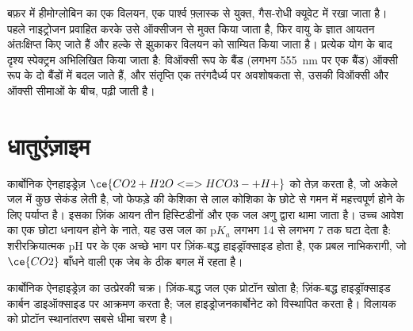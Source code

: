 \begin{inthelab}[एक ऑक्सीजन-बंधन वक्र]
बफ़र में हीमोग्लोबिन का एक विलयन, एक पार्श्व फ़्लास्क से युक्त, गैस-रोधी क्यूवेट में
रखा जाता है। पहले नाइट्रोजन प्रवाहित करके उसे ऑक्सीजन से मुक्त किया जाता है, फिर
वायु के ज्ञात आयतन अंतःक्षिप्त किए जाते हैं और हल्के से झुकाकर विलयन को साम्यित किया जाता है।
प्रत्येक योग के बाद दृश्य स्पेक्ट्रम अभिलिखित किया जाता है: विऑक्सी रूप के बैंड
(लगभग \qty{555}{nm} पर एक बैंड) ऑक्सी रूप के दो बैंडों में बदल जाते हैं,
और संतृप्ति एक तरंगदैर्ध्य पर अवशोषकता से, उसकी
विऑक्सी और ऑक्सी सीमाओं के बीच, पढ़ी जाती है।
\end{inthelab}

\section{धातुएंज़ाइम}

कार्बोनिक ऐनहाइड्रेज़ $\ce{CO2 + H2O <=> HCO3- + H+}$ को तेज़ करता है, जो अकेले जल में
कुछ सेकंड लेती है, जो फेफड़े की केशिका से लाल कोशिका के छोटे से गमन में महत्त्वपूर्ण होने के लिए
पर्याप्त है। इसका ज़िंक आयन तीन हिस्टिडीनों और एक जल अणु द्वारा थामा जाता है।
उच्च आवेश का एक छोटा धनायन होने के नाते, यह उस जल का $\mathrm pK_a$ लगभग 14 से
लगभग 7 तक घटा देता है: शरीरक्रियात्मक pH पर  के एक अच्छे भाग पर ज़िंक-बद्ध
हाइड्रॉक्साइड होता है, एक प्रबल नाभिकरागी, जो $\ce{CO2}$ बाँधने वाली एक जेब के ठीक बगल में रहता है।

\begin{omfigure}

{\small कार्बोनिक ऐनहाइड्रेज़ का उत्प्रेरकी चक्र। ज़िंक-बद्ध जल एक
प्रोटॉन खोता है; ज़िंक-बद्ध हाइड्रॉक्साइड कार्बन डाइऑक्साइड पर आक्रमण करता है; जल
हाइड्रोजनकार्बोनेट को विस्थापित करता है। विलायक को प्रोटॉन स्थानांतरण सबसे धीमा चरण है।}
\end{omfigure}

